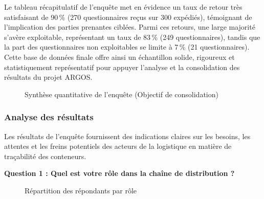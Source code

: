 \indent Le tableau récapitulatif de l’enquête met en évidence un taux de retour très satisfaisant de 90\,\% (270 questionnaires reçus sur 300 expédiés), témoignant de l'implication des parties prenantes ciblées. Parmi ces retours, une large majorité s'avère exploitable, représentant un taux de 83\,\% (249 questionnaires), tandis que la part des questionnaires non exploitables se limite à 7\,\% (21 questionnaires). Cette base de données finale offre ainsi un échantillon solide, rigoureux et statistiquement représentatif pour appuyer l'analyse et la consolidation des résultats du projet ARGOS.

\begin{figure}[H]
	\centering
	\caption{Synthèse quantitative de l'enquête (Objectif de consolidation)}
	\label{fig-synthese-enquete-graphe}
    \tablesourcepromoteurs
\end{figure}

\subsubsection{Analyse des résultats}

Les résultats de l'enquête fournissent des indications claires sur les besoins, les attentes et les freins potentiels des acteurs de la logistique en matière de traçabilité des conteneurs.

\textbf{Question 1 : Quel est votre rôle dans la chaîne de distribution ?}

\begin{figure}[H]
	\centering
	\shorthandoff{:} %
	\shorthandon{:} %
	\caption{Répartition des répondants par rôle}
	\label{fig:roles}
    \tablesourcepromoteurs

\end{figure}

